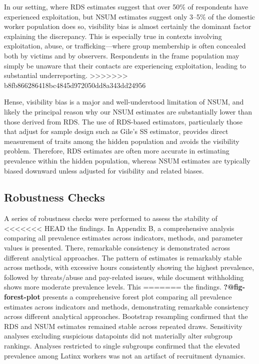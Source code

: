 \documentclass[
  12pt,
  letterpaper,
  DIV=11,
  numbers=noendperiod]{scrartcl}
\theoremstyle{plain}
\theoremstyle{definition}
\begin{document}
{In our setting, where RDS estimates suggest that over 50\% of
respondents have experienced exploitation, but NSUM estimates suggest
only 3--5\% of the domestic worker population does so, visibility bias
is almost certainly the dominant factor explaining the discrepancy. This
is especially true in contexts involving exploitation, abuse, or
trafficking---where group membership is often concealed both by victims
and by observers. Respondents in the frame population may simply be
unaware that their contacts are experiencing exploitation, leading to
substantial underreporting.
>>>>>>> b8fb866286418bc4845d972050dd8a343dd24956

Hense, visibility bias is a major and well-understood limitation of
NSUM, and likely the principal reason why our NSUM estimates are
substantially lower than those derived from RDS. The use of RDS-based
estimators, particularly those that adjust for sample design such as
Gile's SS estimator, provides direct measurement of traits among the
hidden population and avoids the visibility problem. Therefore, RDS
estimates are often more accurate in estimating prevalence within the
hidden population, whereas NSUM estimates are typically biased downward
unless adjusted for visibility and related biases.

\subsection{Robustness Checks}\label{robustness-checks}

A series of robustness checks were performed to assess the stability of
<<<<<<< HEAD
the findings. In Appendix B, a comprehensive analysis comparing all
prevalence estimates across indicators, methods, and parameter values is
presented. There, remarkable consistency is demonstrated across
different analytical approaches. The pattern of estimates is remarkably
stable across methods, with excessive hours consistently showing the
highest prevalence, followed by threats/abuse and pay-related issues,
while document withholding shows more moderate prevalence levels. This
=======
the findings. \textbf{?@fig-forest-plot} presents a comprehensive forest
plot comparing all prevalence estimates across indicators and methods,
demonstrating remarkable consistency across different analytical
approaches. Bootstrap resampling confirmed that the RDS and NSUM
estimates remained stable across repeated draws. Sensitivity analyses
excluding suspicious datapoints did not materially alter subgroup
rankings. Analyses restricted to single subgroups confirmed that the
elevated prevalence among Latinx workers was not an artifact of
recruitment dynamics.

}
\end{document}
